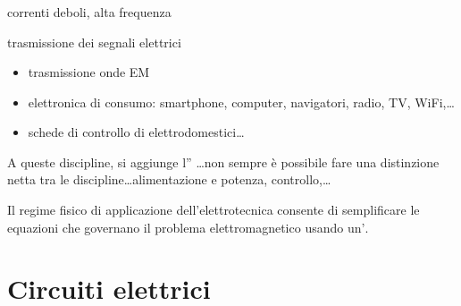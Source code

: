 \documentclass[letterpaper,10pt,italian]{jupyterBook}
\begin{document}
\subsubsection*{}

\sphinxAtStartPar
{} correnti deboli, alta frequenza

\sphinxAtStartPar
{} trasmissione dei segnali elettrici
\begin{itemize}
\item {} 
\sphinxAtStartPar
trasmissione onde EM

\item {} 
\sphinxAtStartPar
elettronica di consumo: smartphone, computer, navigatori, radio, TV, Wi\sphinxhyphen{}Fi,…

\item {} 
\sphinxAtStartPar
schede di controllo di elettrodomestici…

\end{itemize}

\sphinxAtStartPar
A queste discipline, si aggiunge l” …non sempre è possibile fare una distinzione netta tra le discipline…alimentazione e potenza, controllo,…

\sphinxAtStartPar
Il regime fisico di applicazione dell’elettrotecnica consente di semplificare le equazioni che governano il problema elettromagnetico usando un\(\text{'}\).

\sphinxstepscope


\section{Circuiti elettrici}
\label{\detokenize{ch/electromagnetism/circuits-electric:circuiti-elettrici}}\label{\detokenize{ch/electromagnetism/circuits-electric:physics-hs-electromagnetism-circuits-electric}}\label{\detokenize{ch/electromagnetism/circuits-electric::doc}}
\end{document}
